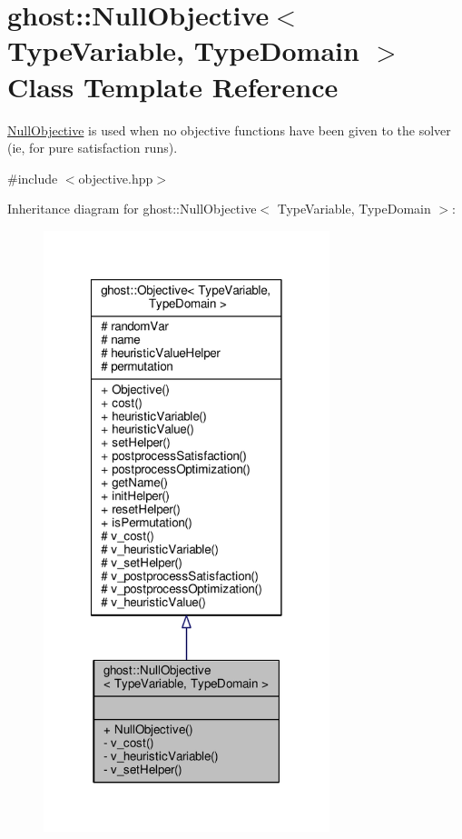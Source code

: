 \hypertarget{classghost_1_1NullObjective}{\section{ghost\-:\-:Null\-Objective$<$ Type\-Variable, Type\-Domain $>$ Class Template Reference}
\label{classghost_1_1NullObjective}
}


\hyperlink{classghost_1_1NullObjective}{Null\-Objective} is used when no objective functions have been given to the solver (ie, for pure satisfaction runs).  




{\ttfamily \#include $<$objective.\-hpp$>$}



Inheritance diagram for ghost\-:\-:Null\-Objective$<$ Type\-Variable, Type\-Domain $>$\-:\nopagebreak
\begin{figure}[H]
\begin{center}
\leavevmode
\includegraphics[width=236pt]{classghost_1_1NullObjective__inherit__graph}
\end{center}
\end{figure}


